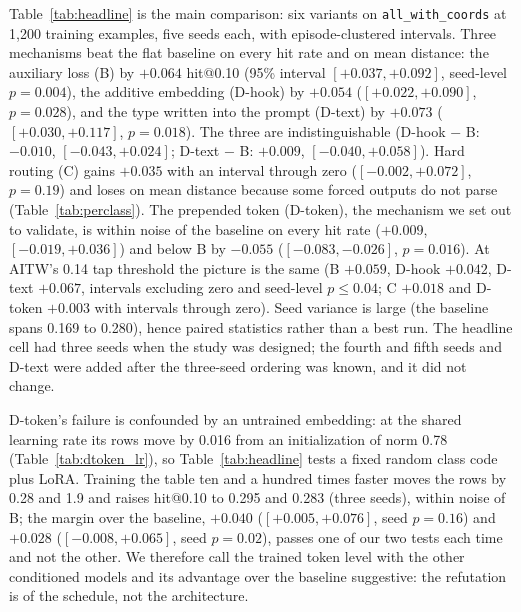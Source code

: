 \documentclass{article}
\makeatletter
\newcommand{\hitat}[1]{hit@#1}
\newcommand{\mix}[1]{\texttt{#1}}
\makeatother
\begin{document}
Table~\ref{tab:headline} is the main comparison: six variants on \mix{all\_with\_coords} at 1,200 training examples, five seeds each, with episode-clustered intervals. Three mechanisms beat the flat baseline on every hit rate and on mean distance: the auxiliary loss (B) by $+0.064$ \hitat{0.10} (95\% interval $[+0.037, +0.092]$, seed-level $p = 0.004$), the additive embedding (D-hook) by $+0.054$ ($[+0.022, +0.090]$, $p = 0.028$), and the type written into the prompt (D-text) by $+0.073$ ($[+0.030, +0.117]$, $p = 0.018$). The three are indistinguishable (D-hook $-$ B: $-0.010$, $[-0.043, +0.024]$; D-text $-$ B: $+0.009$, $[-0.040, +0.058]$). Hard routing (C) gains $+0.035$ with an interval through zero ($[-0.002, +0.072]$, $p = 0.19$) and loses on mean distance because some forced outputs do not parse (Table~\ref{tab:perclass}). The prepended token (D-token), the mechanism we set out to validate, is within noise of the baseline on every hit rate ($+0.009$, $[-0.019, +0.036]$) and below B by $-0.055$ ($[-0.083, -0.026]$, $p = 0.016$). At AITW's 0.14 tap threshold the picture is the same (B $+0.059$, D-hook $+0.042$, D-text $+0.067$, intervals excluding zero and seed-level $p \le 0.04$; C $+0.018$ and D-token $+0.003$ with intervals through zero). Seed variance is large (the baseline spans 0.169 to 0.280), hence paired statistics rather than a best run. The headline cell had three seeds when the study was designed; the fourth and fifth seeds and D-text were added after the three-seed ordering was known, and it did not change.

D-token's failure is confounded by an untrained embedding: at the shared learning rate its rows move by 0.016 from an initialization of norm 0.78 (Table~\ref{tab:dtoken_lr}), so Table~\ref{tab:headline} tests a fixed random class code plus LoRA. Training the table ten and a hundred times faster moves the rows by 0.28 and 1.9 and raises \hitat{0.10} to 0.295 and 0.283 (three seeds), within noise of B; the margin over the baseline, $+0.040$ ($[+0.005, +0.076]$, seed $p = 0.16$) and $+0.028$ ($[-0.008, +0.065]$, seed $p = 0.02$), passes one of our two tests each time and not the other. We therefore call the trained token level with the other conditioned models and its advantage over the baseline suggestive: the refutation is of the schedule, not the architecture.
\end{document}
